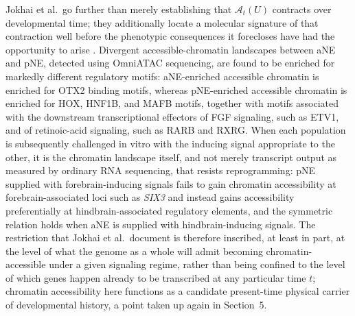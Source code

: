 \documentclass[11pt]{article}
\begin{document}
Jokhai et al.\ go further than merely establishing that $\mathcal{A}_t(U)$ contracts over developmental time; they additionally locate a molecular signature of that contraction well before the phenotypic consequences it forecloses have had the opportunity to arise \cite{jokhai2026}. Divergent accessible-chromatin landscapes between aNE and pNE, detected using OmniATAC sequencing, are found to be enriched for markedly different regulatory motifs: aNE-enriched accessible chromatin is enriched for OTX2 binding motifs, whereas pNE-enriched accessible chromatin is enriched for HOX, HNF1B, and MAFB motifs, together with motifs associated with the downstream transcriptional effectors of FGF signaling, such as ETV1, and of retinoic-acid signaling, such as RARB and RXRG. When each population is subsequently challenged in vitro with the inducing signal appropriate to the other, it is the chromatin landscape itself, and not merely transcript output as measured by ordinary RNA sequencing, that resists reprogramming: pNE supplied with forebrain-inducing signals fails to gain chromatin accessibility at forebrain-associated loci such as \emph{SIX3} and instead gains accessibility preferentially at hindbrain-associated regulatory elements, and the symmetric relation holds when aNE is supplied with hindbrain-inducing signals. The restriction that Jokhai et al.\ document is therefore inscribed, at least in part, at the level of what the genome as a whole will admit becoming chromatin-accessible under a given signaling regime, rather than being confined to the level of which genes happen already to be transcribed at any particular time $t$; chromatin accessibility here functions as a candidate present-time physical carrier of developmental history, a point taken up again in Section~5.
\end{document}
